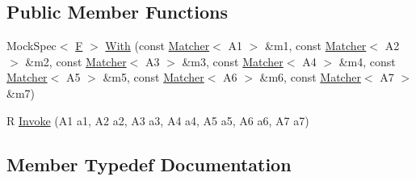 \subsection*{Public Member Functions}
\begin{DoxyCompactItemize}
\item 
Mock\+Spec$<$ \mbox{\hyperlink{classtesting_1_1internal_1_1FunctionMocker_3_01R_07A1_00_01A2_00_01A3_00_01A4_00_01A5_00_01A6_00_01A7_08_4_a2ea0e33d9cc0d1f57d58b4aee98c117c}{F}} $>$ \mbox{\hyperlink{classtesting_1_1internal_1_1FunctionMocker_3_01R_07A1_00_01A2_00_01A3_00_01A4_00_01A5_00_01A6_00_01A7_08_4_a867b7a16d36bb314318265e1f4dbaf92}{With}} (const \mbox{\hyperlink{classtesting_1_1Matcher}{Matcher}}$<$ A1 $>$ \&m1, const \mbox{\hyperlink{classtesting_1_1Matcher}{Matcher}}$<$ A2 $>$ \&m2, const \mbox{\hyperlink{classtesting_1_1Matcher}{Matcher}}$<$ A3 $>$ \&m3, const \mbox{\hyperlink{classtesting_1_1Matcher}{Matcher}}$<$ A4 $>$ \&m4, const \mbox{\hyperlink{classtesting_1_1Matcher}{Matcher}}$<$ A5 $>$ \&m5, const \mbox{\hyperlink{classtesting_1_1Matcher}{Matcher}}$<$ A6 $>$ \&m6, const \mbox{\hyperlink{classtesting_1_1Matcher}{Matcher}}$<$ A7 $>$ \&m7)
\item 
R \mbox{\hyperlink{classtesting_1_1internal_1_1FunctionMocker_3_01R_07A1_00_01A2_00_01A3_00_01A4_00_01A5_00_01A6_00_01A7_08_4_a9088342f6d93448dba290e565c006979}{Invoke}} (A1 a1, A2 a2, A3 a3, A4 a4, A5 a5, A6 a6, A7 a7)
\end{DoxyCompactItemize}


\subsection{Member Typedef Documentation}
\mbox{\label{classtesting_1_1internal_1_1FunctionMocker_3_01R_07A1_00_01A2_00_01A3_00_01A4_00_01A5_00_01A6_00_01A7_08_4_a313911b9c80b57c8c25f0ad5ef2d0bdc}} 
